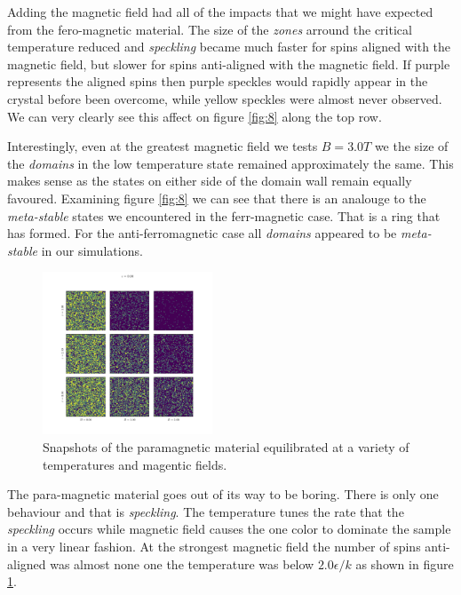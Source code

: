 \documentclass[a4paper, twocolumn]{article}
\begin{document}
Adding the magnetic field had all of the impacts that we might have %
expected from the fero-magnetic material. The size of the \emph{zones} %
arround the critical temperature reduced and \emph{speckling} became %
much faster for spins aligned with the magnetic field, but slower for %
spins anti-aligned with the magnetic field. If purple represents the %
aligned spins then purple speckles would rapidly appear in the crystal %
before been overcome, while yellow speckles were almost never observed. %
We can very clearly see this affect on figure \ref{fig:8} along the top %
row. 


Interestingly, even at the greatest magnetic field we tests \(B = 3.0T\) %
we the size of the \emph{domains} in the low temperature state remained %
approximately the same. This makes sense as the states on either side %
of the domain wall remain equally favoured. Examining figure \ref{fig:8} %
we can see that there is an analouge to the \emph{meta-stable} states %
we encountered in the ferr-magnetic case. That is a ring that has formed. %
For the anti-ferromagnetic case all \emph{domains} appeared to be %
\emph{meta-stable} in our simulations. 


\begin{figure}[h]
    \centering
    \includegraphics[width=0.45\textwidth]{pub/figures/external_field_epsilon_zero.pdf}
    \caption{Snapshots of the paramagnetic material equilibrated at %
        a variety of temperatures and magentic fields.}
    \label{fig:9}
\end{figure}


The para-magnetic material goes out of its way to be boring. There is only %
one behaviour and that is \emph{speckling}. The temperature tunes the %
rate that the \emph{speckling} occurs while magnetic field causes the %
one color to dominate the sample in a very linear fashion. At the strongest %
magnetic field the number of spins anti-aligned was almost none one %
the temperature was below \(2.0 \epsilon / k\) as shown in figure \ref{fig:9}.
\end{document}
